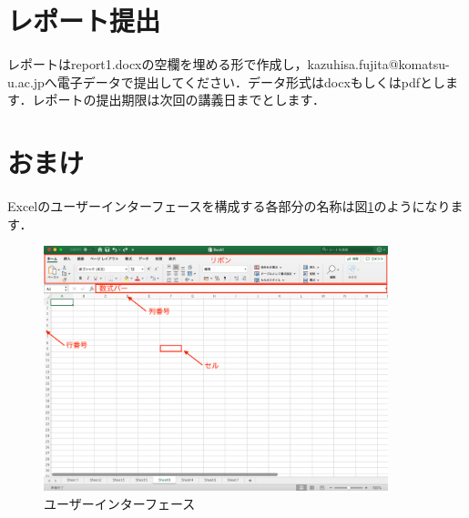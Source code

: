 \section{レポート提出}

レポートはreport1.docxの空欄を埋める形で作成し，kazuhisa.fujita@komatsu-u.ac.jpへ電子データで提出してください．データ形式はdocxもしくはpdfとします．レポートの提出期限は次回の講義日までとします．

\section{おまけ}

Excelのユーザーインターフェースを構成する各部分の名称は図\ref{fig:ui}のようになります．

\begin{figure}[htbp]
    \centering
    \includegraphics[width=10cm]{chap1/ui.png}
    \caption{ユーザーインターフェース}
    \label{fig:ui}
\end{figure}
